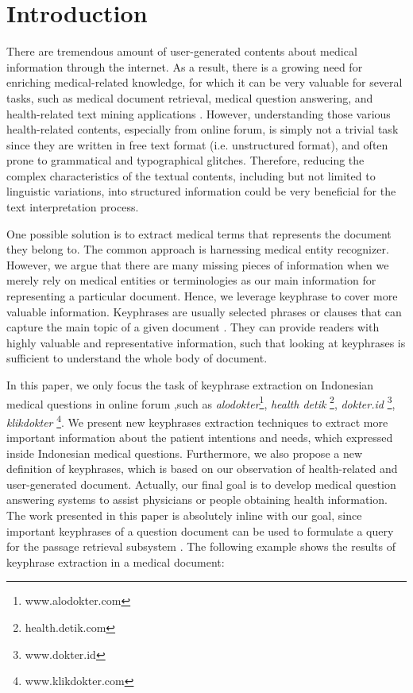 \section{Introduction}

There are tremendous amount of user-generated contents about medical information through the internet. As a result, there is a growing need for enriching medical-related knowledge, for which it can be very valuable for several tasks, such as medical document retrieval, medical question answering, and health-related text mining applications \cite{cao2010automatically}. However, understanding those various health-related contents, especially from online forum, is simply not a trivial task since they are written in free text format (i.e. unstructured format), and often prone to grammatical and typographical glitches. Therefore, reducing the complex characteristics of the textual contents, including but not limited to linguistic variations, into structured information could be very beneficial for the text interpretation process. 

One possible solution is to extract medical terms that represents the document they belong to. The common approach is harnessing medical entity recognizer. However, we argue that there are many missing pieces of information when we merely rely on medical entities or terminologies as our main information for representing a particular document. Hence, we leverage keyphrase to cover more valuable information. Keyphrases are usually selected phrases or clauses that can capture the main topic of a given document \cite{turney2000learning}. They can provide readers with highly valuable and representative information, such that looking at keyphrases is sufficient to understand the whole body of document.

In this paper, we only focus the task of keyphrase extraction on Indonesian medical questions in online forum ,such as \textit{alodokter}\footnote{www.alodokter.com}, \textit{health detik} \footnote{health.detik.com}, \textit{dokter.id} \footnote{www.dokter.id}, \textit{klikdokter} \footnote{www.klikdokter.com}. We present new keyphrases extraction techniques to extract more important information about the patient intentions and needs, which expressed inside Indonesian medical questions. Furthermore, we also propose a new definition of keyphrases, which is based on our observation of health-related and user-generated document. Actually, our final goal is to develop medical question answering systems to assist physicians or people obtaining health information. The work presented in this paper is absolutely inline with our goal, since important keyphrases of a question document can be used to formulate a query for the passage retrieval subsystem \cite{gong2009improving}. The following example shows the results of keyphrase extraction in a medical document:

